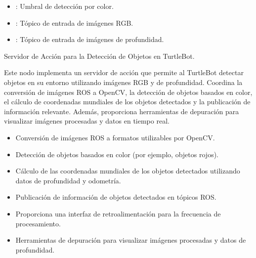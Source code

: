 \documentclass[a4paper,10pt,spanish]{sphinxmanual}
\begin{document}
\sphinxAtStartPar
{}
\begin{itemize}
\item {} 
\sphinxAtStartPar
{}: Umbral de detección por color.

\item {} 
\sphinxAtStartPar
{}: Tópico de entrada de imágenes RGB.

\item {} 
\sphinxAtStartPar
{}: Tópico de entrada de imágenes de profundidad.

\end{itemize}
\label{\detokenize{squad_object_detection_action:module-squad_object_detection_action}}
\sphinxAtStartPar
Servidor de Acción para la Detección de Objetos en TurtleBot.

\sphinxAtStartPar
Este nodo implementa un servidor de acción que permite al TurtleBot detectar objetos en su entorno
utilizando imágenes RGB y de profundidad. Coordina la conversión de imágenes ROS a OpenCV, la detección
de objetos basados en color, el cálculo de coordenadas mundiales de los objetos detectados y la publicación
de información relevante. Además, proporciona herramientas de depuración para visualizar imágenes
procesadas y datos en tiempo real.
\begin{description}
\begin{itemize}
\item {} 
\sphinxAtStartPar
Conversión de imágenes ROS a formatos utilizables por OpenCV.

\item {} 
\sphinxAtStartPar
Detección de objetos basados en color (por ejemplo, objetos rojos).

\item {} 
\sphinxAtStartPar
Cálculo de las coordenadas mundiales de los objetos detectados utilizando datos de
profundidad y odometría.

\item {} 
\sphinxAtStartPar
Publicación de información de objetos detectados en tópicos ROS.

\item {} 
\sphinxAtStartPar
Proporciona una interfaz de retroalimentación para la frecuencia de procesamiento.

\item {} 
\sphinxAtStartPar
Herramientas de depuración para visualizar imágenes procesadas y datos de profundidad.

\end{itemize}

\end{description}
\end{document}

